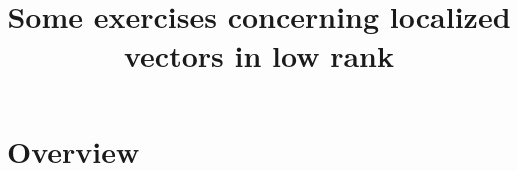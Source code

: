 \documentclass[reqno]{amsart} 
\title{Some exercises concerning localized vectors in low rank}
\numberwithin{equation}{section}
\numberwithin{theorem}{section}
\begin{document}
\section{Overview}\label{sec:d1a9162ede03}






{} 
\end{document}

